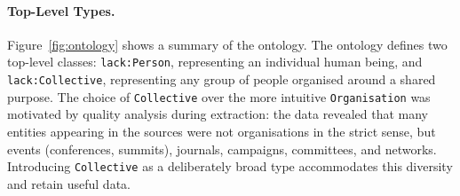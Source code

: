 \paragraph{Top-Level Types.}
Figure~\ref{fig:ontology} shows a summary of the ontology.
The ontology defines two top-level classes: \texttt{lack:Person}, representing an individual human being, and \texttt{lack:Collective}, representing any group of people organised around a shared purpose.
The choice of \texttt{Collective} over the more intuitive \texttt{Organisation} was motivated by quality analysis during extraction: the data revealed that many entities appearing in the sources were not organisations in the strict sense, but events (conferences, summits), journals, campaigns, committees, and networks.
Introducing \texttt{Collective} as a deliberately broad type accommodates this diversity and retain useful data.

